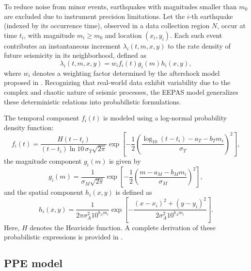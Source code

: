 \documentclass[linenum,doublespace,onecolumn]{SSA-SRL}
\theoremstyle{lemma}
\begin{document}
To reduce noise from minor events, earthquakes with magnitudes smaller than $m_0$ are excluded due to instrument precision limitations. Let the $i$-th earthquake (indexed by its occurrence time), observed in a data collection region $N$, occur at time $t_i$, with magnitude $m_i \geq m_0$ and location $(x_i, y_i)$. Each such event contributes an instantaneous increment $\lambda_i(t,m,x,y)$ to the rate density of future seismicity in its neighborhood, defined as
\begin{equation}\label{li}
    \lambda_i(t,m,x,y) = w_i f_i(t) g_i(m) h_i(x,y),
\end{equation}
where $w_i$ denotes a weighting factor determined by the aftershock model proposed in \cite{Rhoades}. Recognizing that real-world data exhibit variability due to the complex and chaotic nature of seismic processes, the EEPAS model generalizes these deterministic relations into probabilistic formulations.

The temporal component $f_i(t)$ is modeled using a log-normal probability density function:
\begin{equation}\label{ft}
    f_i(t) = \frac{H(t - t_i)}{(t - t_i)\ln 10\, \sigma_T \sqrt{2\pi}} \exp{\left[ -\frac{1}{2} \left( \frac{\log_{10}(t - t_i) - a_T - b_T m_i}{\sigma_T} \right)^2 \right]},
\end{equation}
the magnitude component $g_i(m)$ is given by
\begin{equation}\label{gm}
    g_i(m) = \frac{1}{\sigma_M \sqrt{2\pi}} \exp{\left[ -\frac{1}{2} \left( \frac{m - a_M - b_M m_i}{\sigma_M} \right)^2 \right]},
\end{equation}
and the spatial component $h_i(x,y)$ is defined as
\begin{equation}\label{hxy}
    h_i(x,y) = \frac{1}{2\pi \sigma_A^2 10^{b_A m_i}} \exp{\left[ -\frac{(x - x_i)^2 + (y - y_i)^2}{2 \sigma_A^2 10^{b_A m_i}} \right]}.
\end{equation}
Here, $H$ denotes the Heaviside function. A complete derivation of these probabilistic expressions is provided in .


\subsection{PPE model}
\end{document}
